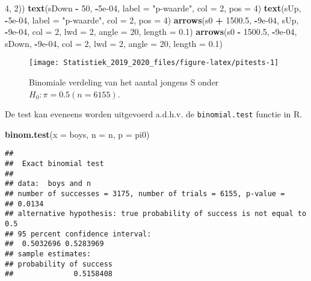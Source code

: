 \documentclass[12pt,dutch,coursenotes]{book}
\newenvironment{Shaded}{\begin{snugshade}}{\end{snugshade}}
\newcommand{\KeywordTok}[1]{\textcolor[rgb]{0.13,0.29,0.53}{\textbf{#1}}}
\newcommand{\DataTypeTok}[1]{\textcolor[rgb]{0.13,0.29,0.53}{#1}}
\newcommand{\DecValTok}[1]{\textcolor[rgb]{0.00,0.00,0.81}{#1}}
\newcommand{\FloatTok}[1]{\textcolor[rgb]{0.00,0.00,0.81}{#1}}
\newcommand{\StringTok}[1]{\textcolor[rgb]{0.31,0.60,0.02}{#1}}
\newcommand{\OperatorTok}[1]{\textcolor[rgb]{0.81,0.36,0.00}{\textbf{#1}}}
\newcommand{\NormalTok}[1]{#1}
\theoremstyle{definition}
\theoremstyle{definition}
\theoremstyle{definition}
\theoremstyle{remark}
\begin{document}
\begin{Shaded}
\begin{Highlighting}[]
        \DecValTok{4}\NormalTok{, }\DecValTok{2}\NormalTok{))}
\KeywordTok{text}\NormalTok{(sDown }\OperatorTok{-}\StringTok{ }\DecValTok{50}\NormalTok{, }\OperatorTok{-}\FloatTok{5e-04}\NormalTok{, }\DataTypeTok{label =} \StringTok{"p-waarde"}\NormalTok{, }\DataTypeTok{col =} \DecValTok{2}\NormalTok{, }
    \DataTypeTok{pos =} \DecValTok{4}\NormalTok{)}
\KeywordTok{text}\NormalTok{(sUp, }\OperatorTok{-}\FloatTok{5e-04}\NormalTok{, }\DataTypeTok{label =} \StringTok{"p-waarde"}\NormalTok{, }\DataTypeTok{col =} \DecValTok{2}\NormalTok{, }\DataTypeTok{pos =} \DecValTok{4}\NormalTok{)}
\KeywordTok{arrows}\NormalTok{(s0 }\OperatorTok{+}\StringTok{ }\FloatTok{1500.5}\NormalTok{, }\OperatorTok{-}\FloatTok{9e-04}\NormalTok{, sUp, }\OperatorTok{-}\FloatTok{9e-04}\NormalTok{, }\DataTypeTok{col =} \DecValTok{2}\NormalTok{, }\DataTypeTok{lwd =} \DecValTok{2}\NormalTok{, }
    \DataTypeTok{angle =} \DecValTok{20}\NormalTok{, }\DataTypeTok{length =} \FloatTok{0.1}\NormalTok{)}
\KeywordTok{arrows}\NormalTok{(s0 }\OperatorTok{-}\StringTok{ }\FloatTok{1500.5}\NormalTok{, }\OperatorTok{-}\FloatTok{9e-04}\NormalTok{, sDown, }\OperatorTok{-}\FloatTok{9e-04}\NormalTok{, }\DataTypeTok{col =} \DecValTok{2}\NormalTok{, }
    \DataTypeTok{lwd =} \DecValTok{2}\NormalTok{, }\DataTypeTok{angle =} \DecValTok{20}\NormalTok{, }\DataTypeTok{length =} \FloatTok{0.1}\NormalTok{)}
\end{Highlighting}
\end{Shaded}

\begin{figure}

{\centering \texttt{[image: Statistiek\_2019\_2020\_files/figure-latex/pitests-1]} 

}

\caption{Binomiale verdeling van het aantal jongens S onder $H_0: \pi=0.5 (n=6155)$.}\label{fig:pitests}
\end{figure}

De test kan eveneens worden uitgevoerd a.d.h.v. de
\texttt{binomial.test} functie in R.

\begin{Shaded}
\begin{Highlighting}[]
\KeywordTok{binom.test}\NormalTok{(}\DataTypeTok{x =}\NormalTok{ boys, }\DataTypeTok{n =}\NormalTok{ n, }\DataTypeTok{p =}\NormalTok{ pi0)}
\end{Highlighting}
\end{Shaded}

\begin{verbatim}
## 
##  Exact binomial test
## 
## data:  boys and n
## number of successes = 3175, number of trials = 6155, p-value =
## 0.0134
## alternative hypothesis: true probability of success is not equal to 0.5
## 95 percent confidence interval:
##  0.5032696 0.5283969
## sample estimates:
## probability of success 
##              0.5158408
\end{verbatim}
\end{document}
